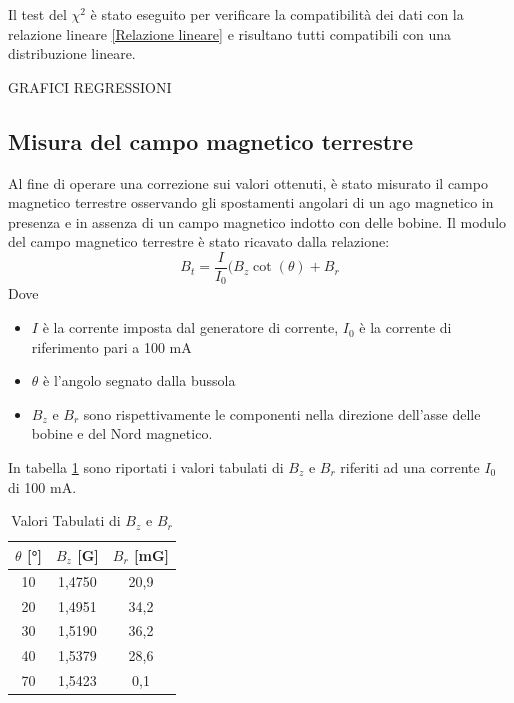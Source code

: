 \documentclass{article}
\begin{document}
    Il test del $\chi^2$ è stato eseguito per verificare la compatibilità dei dati con la relazione lineare \ref{Relazione lineare} e risultano tutti compatibili con una distribuzione lineare.
   
       
    GRAFICI REGRESSIONI

    

\subsection{Misura del campo magnetico terrestre}
    Al fine di operare una correzione sui valori ottenuti, è stato misurato il campo magnetico terrestre osservando gli spostamenti angolari di un ago magnetico in presenza e in assenza di un campo magnetico indotto con delle bobine. Il modulo del campo magnetico terrestre è stato ricavato dalla relazione:\\
    \[B_t = \frac{I}{I_0}(B_z\cot(\theta)+B_r\]
    Dove
    \begin{itemize}
        \item $I$ è la corrente imposta dal generatore di corrente, $I_0$ è la corrente di riferimento pari a 100 mA
        \item $\theta$ è l'angolo segnato dalla bussola
        \item $B_z$ e $B_r$ sono rispettivamente le componenti nella direzione dell'asse delle bobine e del Nord magnetico.
    \end{itemize}
    In tabella \ref{tab:B tabulati} sono riportati i valori tabulati di $B_z$ e $B_r$ riferiti ad una corrente $I_0$ di 100 mA.

    \begin{table}[h]
        \centering            
            \begin{tabular}{ccc}
            \toprule
            $\theta$ [°] & $B_z$ [G] & $B_r$ [mG] \\ 
            \midrule
            10 & 1,4750 & 20,9 \\ 
            20 & 1,4951 & 34,2 \\ 
            30 & 1,5190 & 36,2 \\ 
            40 & 1,5379 & 28,6 \\ 
            70 & 1,5423 & 0,1 \\ 
            \bottomrule
        \end{tabular}
        \caption{Valori Tabulati di $B_z$ e $B_r$}
        \label{tab:B tabulati} 
    \end{table}
\end{document}
